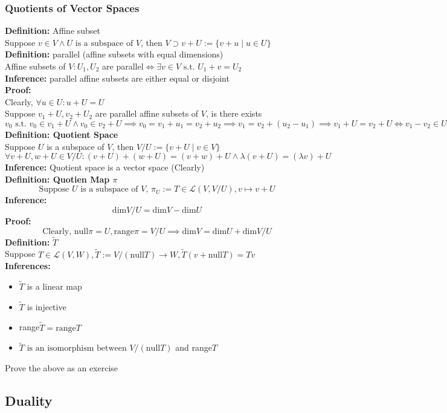 \documentclass{article}
\newcommand{\st}{\mbox{ s.t. }}
\newcommand{\0}{{\bf{0}}}
\begin{document}
\subsubsection{Quotients of Vector Spaces}
\textbf{Definition:} Affine subset\\
Suppose $v\in V\land U\mbox{ is a subspace of }V$, then $V\supset v+U:=\{v+u\mid u\in U\}$\\
\textbf{Definition:} parallel (affine subsets with equal dimensions)\\
Affine subsets of $V:U_1,U_2$ are parallel$\iff\exists v\in V\st U_1+v=U_2$\\
\textbf{Inference:} parallel affine subsets are either equal or disjoint\\
\textbf{Proof:}\\
Clearly, $\forall u\in U:u+U=U$\\
Suppose $v_1+U,v_2+U_2$ are parallel affine subsets of $V$, is there exists $v_0\st v_0\in v_1+U\land v_0\in v_2+U\implies v_0=v_1+u_1=v_2+u_2\implies v_1=v_2+(u_2-u_1)\implies v_1+U=v_2+U\iff v_1-v_2\in U$\\
\textbf{Definition: Quotient Space}\\
Suppose $U$ is a subspace of $V$, then $V/U:=\{v+U\mid v\in V\}$
$$\forall v+U,w+U\in V/U:(v+U)+(w+U)=(v+w)+U\land\lambda(v+U)=(\lambda v)+U$$
\textbf{Inference: }Quotient space is a vector space (Clearly)\\
\textbf{Definition: Quotien Map $\pi$}
$$\mbox{Suppose $U$ is a subspace of $V$, }\pi_U:=T\in\mathcal{L}(V,V/U),v\mapsto v+U$$
\textbf{Inference:}
$$\mbox{dim}V/U=\mbox{dim}V-\mbox{dim}U$$
\textbf{Proof:}
$$\mbox{Clearly, null}\pi=U,\mbox{range}\pi=V/U\implies\mbox{dim}V=\mbox{dim}U+\mbox{dim}V/U$$
\textbf{Definition:} $\tilde{T}$\\
Suppose $T\in\mathcal{L}(V,W),\tilde{T}:=V/(\mbox{null}T)\to W,\tilde{T}(v+\mbox{null}T)=Tv$\\
\textbf{Inferences:}
\begin{itemize}
    \item $\tilde{T}$ is a linear map
    \item $\tilde{T}$ is injective
    \item range$\tilde{T}=\mbox{range}T$
    \item $\tilde{T}\mbox{ is an isomorphism between }V/(\mbox{null}T)$ and range$T$
\end{itemize}
\null\hfill{Prove the above as an exercise}
\subsection{Duality}
\end{document}
